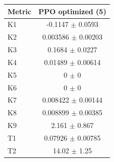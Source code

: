 \begin{tabular}{lc}
\toprule
Metric & PPO optimized (5) \\
\midrule
K1 & -0.1147 $\pm$ 0.0593 \\
K2 & 0.003586 $\pm$ 0.00203 \\
K3 & 0.1684 $\pm$ 0.0227 \\
K4 & 0.01489 $\pm$ 0.00614 \\
K5 & 0 $\pm$ 0 \\
K6 & 0 $\pm$ 0 \\
K7 & 0.008422 $\pm$ 0.00144 \\
K8 & 0.008899 $\pm$ 0.00385 \\
K9 & 2.161 $\pm$ 0.867 \\
T1 & 0.07926 $\pm$ 0.00785 \\
T2 & 14.02 $\pm$ 1.25 \\
\bottomrule
\end{tabular}
